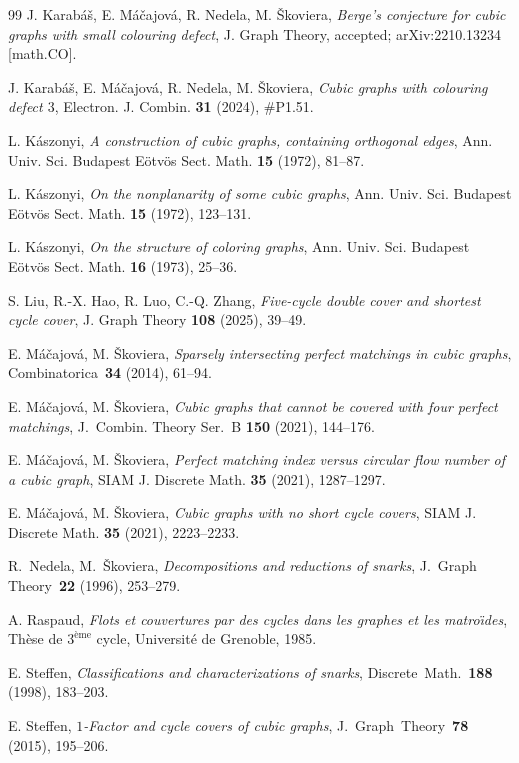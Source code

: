\documentclass[a4paper]{amsart}
\theoremstyle{plain}
\theoremstyle{definition}
\begin{document}
\begin{thebibliography}{99}
 J. Karab\'a\v s, E. M\'a\v cajov\'a, R.
    Nedela, M. \v Skoviera, \emph{Berge's conjecture for cubic
    graphs with small colouring defect}, J. Graph Theory,
    accepted; arXiv:2210.13234 [math.CO].

 J. Karab\'a\v s, E. M\'a\v cajov\'a, R.
    Nedela, M. \v Skoviera, \emph{Cubic graphs with colouring
    defect $3$}, Electron. J. Combin. \textbf{31} (2024),
    $\#$P1.51.

 L. K\'aszonyi, \emph{A construction of
    cubic graphs, containing orthogonal edges}, Ann. Univ. Sci.
    Budapest E\"otv\"os Sect. Math. \textbf{15} (1972), 81--87.

 L. K\'aszonyi, \emph{On the nonplanarity
    of some cubic graphs}, Ann. Univ. Sci. Budapest E\"otv\"os
    Sect. Math. \textbf{15} (1972), 123--131.

 L. K\'aszonyi, \emph{On the structure of
    coloring graphs}, Ann. Univ. Sci. Budapest E\"otv\"os Sect.
    Math. \textbf{16} (1973), 25--36.

 S. Liu, R.-X. Hao, R. Luo, C.-Q. Zhang,
    \emph{Five-cycle double cover and shortest cycle cover}, J.
    Graph Theory \textbf{108} (2025), 39--49.

 E. M\'a\v cajov\'a, M. \v Skoviera,
    \emph{Sparsely intersecting perfect matchings in cubic
    graphs}, Combinatorica~\textbf{34} (2014), 61--94.

 E. M\'a\v cajov\'a, M. \v Skoviera, \emph{Cubic
    graphs that cannot be covered with four perfect matchings},
    J.~Combin. Theory Ser.~B \textbf{150} (2021), 144--176.

 E. M\'a\v cajov\'a, M. \v Skoviera,
    \emph{Perfect matching index versus circular flow number of
    a cubic graph}, SIAM J. Discrete Math. \textbf{35} (2021),
    1287--1297.

 E. M\'a\v cajov\'a, M. \v Skoviera,
    \emph{Cubic graphs with no short cycle covers}, SIAM J.
    Discrete Math. \textbf{35} (2021),  2223--2233.

 R.~Nedela, M.~\v Skoviera,
    \emph{Decompositions and reductions of snarks}, J.~Graph
    Theory~\textbf{22} (1996), 253--279.

 A. Raspaud, \emph{Flots et couvertures
    par des cycles dans les graphes et les matro\"\i des},
    Th\`ese de $3^{\text{\`eme}}$ cycle, Universit\'e de
    Grenoble, 1985.

 E. Steffen, \emph{Classifications and
    characterizations of snarks}, Discrete~Math.~\textbf{188}
    (1998), 183--203.

 E. Steffen, \emph{$1$-Factor and cycle covers of
cubic graphs}, J.~Graph~Theory~\textbf{78} (2015), 195--206.
\end{thebibliography}

\bigskip{}\smallskip
\end{document}
